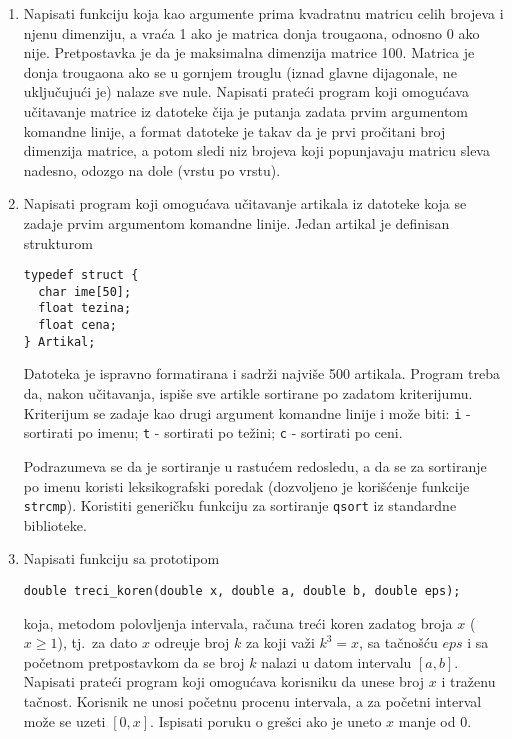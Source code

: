 \begin{enumerate}
\item Napisati funkciju koja kao argumente prima kvadratnu matricu
  celih brojeva i njenu dimenziju, a vra\'ca 1 ako je matrica donja
  trougaona, odnosno 0 ako nije. Pretpostavka je da je maksimalna dimenzija
  matrice 100. Matrica je donja trougaona ako se u
  gornjem trouglu (iznad glavne dijagonale, ne uklju\v cuju\' ci je)
  nalaze sve nule. Napisati prate\'ci program koji omogu\'cava
  u\v{c}itavanje matrice iz datoteke \v{c}ija je putanja zadata prvim
  argumentom komandne linije, a format datoteke je takav da je prvi
  pro\v{c}itani broj dimenzija matrice, a potom sledi niz brojeva koji
  popunjavaju matricu sleva nadesno, odozgo na dole (vrstu po vrstu).

\item Napisati program koji omogu\'cava u\v{c}itavanje artikala iz
  datoteke koja se zadaje prvim argumentom komandne linije. Jedan
  artikal je definisan strukturom

\begin{verbatim}
typedef struct {
  char ime[50];
  float tezina;
  float cena;
} Artikal;
\end{verbatim}

Datoteka je ispravno formatirana i sadr\v{z}i najvi\v{s}e 500
artikala. Program treba da, nakon u\v{c}itavanja, ispi\v{s}e sve
artikle sortirane po zadatom kriterijumu. Kriterijum se zadaje kao
drugi argument komandne linije i mo\v{z}e biti: \verb|i| - sortirati
po imenu; \verb|t| - sortirati po te\v{z}ini; \verb|c| - sortirati po
ceni.

Podrazumeva se da je sortiranje u rastu\' cem redosledu, a da se
za sortiranje po imenu koristi leksikografski poredak (dozvoljeno
je kori\v s\' cenje funkcije \verb|strcmp|).  Koristiti generi\v
cku funkciju za sortiranje \verb|qsort| iz standardne biblioteke.

\item Napisati funkciju sa prototipom

\begin{verbatim}
double treci_koren(double x, double a, double b, double eps);
\end{verbatim}

koja, metodom polovljenja intervala, ra\v{c}una tre\'ci koren
zadatog broja $x$ ($x \geq 1$), tj.~za dato $x$ odre\d uje broj
$k$ za koji va\v{z}i $k^3=x$, sa ta\v cno\v s\' cu $eps$ i sa
po\v{c}etnom pretpostavkom da se broj $k$ nalazi u datom intervalu
$[a,b]$. Napisati prate\'ci program koji omogu\'cava korisniku da
unese broj $x$ i tra\v{z}enu ta\v{c}nost. Korisnik ne unosi
po\v{c}etnu procenu intervala, a za po\v{c}etni interval mo\v{z}e
se uzeti $[0,x]$. Ispisati poruku o gre\v{s}ci ako je uneto $x$
manje od $0$.
\end{enumerate}

